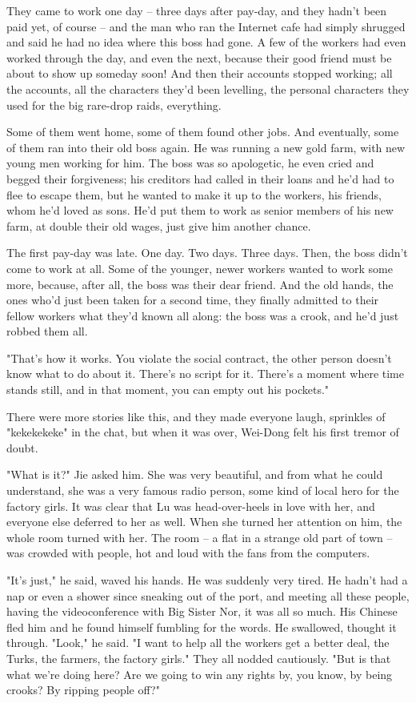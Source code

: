 They came to work one day -- three days after pay-day, and they
hadn't been paid yet, of course -- and the man who ran the Internet
cafe had simply shrugged and said he had no idea where this boss
had gone. A few of the workers had even worked through the day, and
even the next, because their good friend must be about to show up
someday soon! And then their accounts stopped working; all the
accounts, all the characters they'd been levelling, the personal
characters they used for the big rare-drop raids, everything.

Some of them went home, some of them found other jobs. And
eventually, some of them ran into their old boss again. He was
running a new gold farm, with new young men working for him. The
boss was so apologetic, he even cried and begged their forgiveness;
his creditors had called in their loans and he'd had to flee to
escape them, but he wanted to make it up to the workers, his
friends, whom he'd loved as sons. He'd put them to work as senior
members of his new farm, at double their old wages, just give him
another chance.

The first pay-day was late. One day. Two days. Three days. Then,
the boss didn't come to work at all. Some of the younger, newer
workers wanted to work some more, because, after all, the boss was
their dear friend. And the old hands, the ones who'd just been
taken for a second time, they finally admitted to their fellow
workers what they'd known all along: the boss was a crook, and he'd
just robbed them all.

"That's how it works. You violate the social contract, the other
person doesn't know what to do about it. There's no script for it.
There's a moment where time stands still, and in that moment, you
can empty out his pockets."

There were more stories like this, and they made everyone laugh,
sprinkles of "kekekekeke" in the chat, but when it was over,
Wei-Dong felt his first tremor of doubt.

"What is it?" Jie asked him. She was very beautiful, and from what
he could understand, she was a very famous radio person, some kind
of local hero for the factory girls. It was clear that Lu was
head-over-heels in love with her, and everyone else deferred to her
as well. When she turned her attention on him, the whole room
turned with her. The room -- a flat in a strange old part of town
-- was crowded with people, hot and loud with the fans from the
computers.

"It's just," he said, waved his hands. He was suddenly very tired.
He hadn't had a nap or even a shower since sneaking out of the
port, and meeting all these people, having the videoconference with
Big Sister Nor, it was all so much. His Chinese fled him and he
found himself fumbling for the words. He swallowed, thought it
through. "Look," he said. "I want to help all the workers get a
better deal, the Turks, the farmers, the factory girls." They all
nodded cautiously. "But is that what we're doing here? Are we going
to win any rights by, you know, by being crooks? By ripping people
off?"

